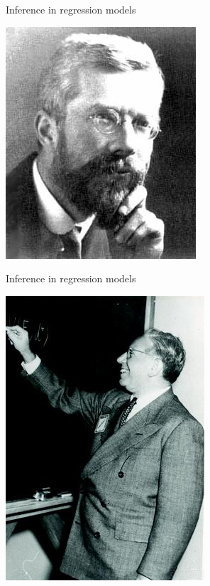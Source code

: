 \documentclass[10pt]{beamer}
\begin{document}
\begin{frame}{Inference in regression models}
\vspace{-1.5cm}
\begin{flushright}
  \includegraphics[width=\threefig]{Figures/fisher.jpg}
\end{flushright}
\vfill 
\end{frame}

\begin{frame}{Inference in regression models}
  \vspace{-1.5cm}
  \begin{flushright}
    \includegraphics[width=\threefig]{Figures/wald2}
  \end{flushright}
  \vfill 
\end{frame}
\end{document}
